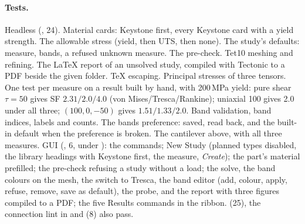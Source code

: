 \paragraph{Tests.} Headless (, 24). Material cards: Keystone first, every Keystone card
with a yield strength. The allowable stress (yield, then UTS, then none). The study's defaults: measure, bands,
a refused unknown measure. The pre-check. Tet10 meshing and refining. The LaTeX report of an unsolved study,
compiled with Tectonic to a PDF beside the given folder. TeX escaping. Principal stresses of three tensors. One
test per measure on a result built by hand, with 200\,MPa yield: pure shear $\tau=50$ gives SF $2.31/2.0/4.0$
(von Mises/Tresca/Rankine); uniaxial 100 gives 2.0 under all three; $(100,0,-50)$ gives $1.51/1.33/2.0$.
Band validation, band indices, labels and counts. The bands preference: saved, read back, and the built-in
default when the preference is broken. The cantilever above, with all three measures. GUI
(, 6, under ): the commands; New Study (planned types
disabled, the library headings with Keystone first, the measure, \emph{Create}); the part's material
prefilled; the pre-check refusing a study without a load; the solve, the band colours on the mesh, the switch
to Tresca, the band editor (add, colour, apply, refuse, remove, save as default), the probe, and the report
with three figures compiled to a PDF; the five Results commands in the ribbon. 
(25), the connection lint in  and  (8) also pass.

